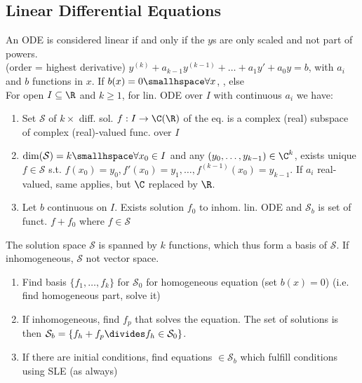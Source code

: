 \newsectionNoPB
\subsection{Linear Differential Equations}
An ODE is considered linear if and only if the $y$s are only scaled and not part of powers.\\
 (order = highest derivative)
$y^{(k)} + a_{k - 1}y^{(k - 1)} + \ldots + a_1 y' + a_0 y = b$, with $a_i$ and $b$ functions in $x$.
If $b(x) = 0 \smallhspace \forall x$, , else \\
%
\shorttheorem For open $I \subseteq \R$ and $k \geq 1$, for lin. ODE over $I$ with continuous $a_i$ we have:
\rmvspace
\begin{enumerate}[noitemsep]
    \item Set $\mathcal{S}$ of $k \times$ diff. sol. $f: I \rightarrow \C (\R)$ of the eq. is a complex (real) subspace of complex (real)-valued func. over $I$
    \item $\dim(\mathcal{S}) = k \smallhspace\forall x_0 \in I$ and any $(y_0, \ldots, y_{k - 1}) \in \C^k$, exists unique
          $f \in \mathcal{S}$ s.t. $f(x_0) = y_0, f'(x_0) = y_1, \ldots, f^{(k - 1)}(x_0) = y_{k - 1}$.
          If $a_i$ real-valued, same applies, but $\C$ replaced by $\R$.
    \item Let $b$ continuous on $I$. Exists solution $f_0$ to inhom. lin. ODE and $\mathcal{S}_b$ is set of funct. $f + f_0$ where $f \in \mathcal{S}$
\end{enumerate}
The solution space $\mathcal{S}$ is spanned by $k$ functions, which thus form a basis of $\mathcal{S}$. If inhomogeneous, $\mathcal{S}$ not vector space.

\rmvspace
\begin{enumerate}[label=\bi{(\arabic*)}, noitemsep]
    \item Find basis $\{ f_1, \ldots, f_k \}$ for $\mathcal{S}_0$ for homogeneous equation (set $b(x) = 0$) (i.e. find homogeneous part, solve it)
    \item If inhomogeneous, find $f_p$ that solves the equation. The set of solutions is then $\mathcal{S}_b = \{ f_h + f_p \divides f_h \in \mathcal{S}_0 \}$.
    \item If there are initial conditions, find equations $\in \mathcal{S}_b$ which fulfill conditions using SLE (as always)
\end{enumerate}
